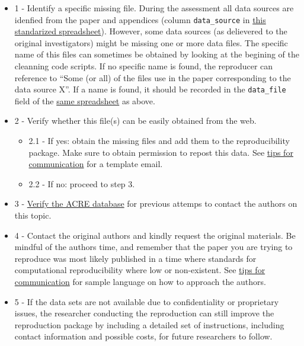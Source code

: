 \documentclass[]{book}
\providecommand{\tightlist}{%
  \setlength{\itemsep}{0pt}\setlength{\parskip}{0pt}}
\begin{document}
\begin{itemize}
\tightlist
\item
  1 - Identify a specific missing file. During the assessment all data sources are idenfied from the paper and appendices (column \texttt{data\_source} in \href{https://docs.google.com/spreadsheets/d/1LUIdVFH0OfR70C7z07TYeE-uWzKI_JIeWUMaYhqEKK0/edit\#gid=0\&range=A1}{this standarized spreadsheet}). However, some data sources (as delievered to the original investigators) might be missing one or more data files. The specific name of this files can sometimes be obtained by looking at the begining of the cleanning code scripts. If no specific name is found, the reproducer can reference to ``Some (or all) of the files use in the paper corresponding to the data source X''. If a name is found, it should be recorded in the \texttt{data\_file} field of the \href{https://docs.google.com/spreadsheets/d/1LUIdVFH0OfR70C7z07TYeE-uWzKI_JIeWUMaYhqEKK0/edit\#gid=0\&range=A1}{same spreadsheet} as above.\\
\item
  2 - Verify whether this file(s) can be easily obtained from the web.

  \begin{itemize}
  \tightlist
  \item
    2.1 - If yes: obtain the missing files and add them to the reproducibility package. Make sure to obtain permission to repost this data. See \protect\hyperlink{tips-for-communication}{tips for communication} for a template email.\\
  \item
    2.2 - If no: proceed to step 3.\\
  \end{itemize}
\item
  3 - \href{ADD\%20LINK}{Verify the ACRE database} for previous attemps to contact the authors on this topic.
\item
  4 - Contact the original authors and kindly request the original materials. Be mindful of the authors time, and remember that the paper you are trying to reproduce was most likely published in a time where standards for computational reproducibility where low or non-existent. See \protect\hyperlink{tips-for-communication}{tips for communication} for sample language on how to approach the authors.\\
\item
  5 - If the data sets are not available due to confidentiality or proprietary issues, the researcher conducting the reproduction can still improve the reproduction package by including a detailed set of instructions, including contact information and possible costs, for future researchers to follow.
\end{itemize}
\end{document}

